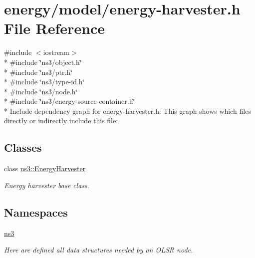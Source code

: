 \hypertarget{energy-harvester_8h}{}\section{energy/model/energy-\/harvester.h File Reference}
\label{energy-harvester_8h}
{\ttfamily \#include $<$iostream$>$}\\*
{\ttfamily \#include \char`\"{}ns3/object.\+h\char`\"{}}\\*
{\ttfamily \#include \char`\"{}ns3/ptr.\+h\char`\"{}}\\*
{\ttfamily \#include \char`\"{}ns3/type-\/id.\+h\char`\"{}}\\*
{\ttfamily \#include \char`\"{}ns3/node.\+h\char`\"{}}\\*
{\ttfamily \#include \char`\"{}ns3/energy-\/source-\/container.\+h\char`\"{}}\\*
Include dependency graph for energy-\/harvester.h\+:
This graph shows which files directly or indirectly include this file\+:
\subsection*{Classes}
\begin{DoxyCompactItemize}
\item 
class \hyperlink{classns3_1_1EnergyHarvester}{ns3\+::\+Energy\+Harvester}
\begin{DoxyCompactList}\small\item\em Energy harvester base class. \end{DoxyCompactList}\end{DoxyCompactItemize}
\subsection*{Namespaces}
\begin{DoxyCompactItemize}
\item 
 \hyperlink{namespacens3}{ns3}
\begin{DoxyCompactList}\small\item\em Here are defined all data structures needed by an O\+L\+SR node. \end{DoxyCompactList}\end{DoxyCompactItemize}
